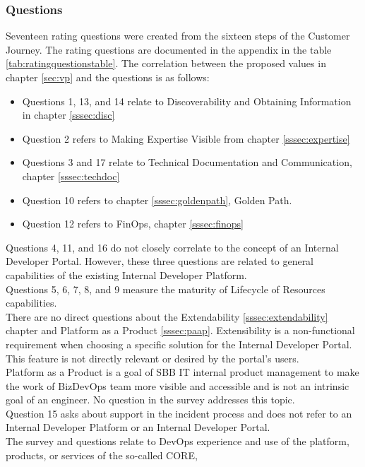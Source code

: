 \documentclass[a4paper,10pt]{article}
\begin{document}
    \subsubsection{Questions}
    \label{sssec:questions}
    Seventeen rating questions were created from the sixteen steps of the Customer Journey.
    The rating questions are documented in the appendix in the table \ref{tab:ratingquestionstable}.
    The correlation between the proposed values in chapter \ref{sec:vp} and the questions is as follows:
    \begin{itemize}
        \item Questions 1, 13, and 14 relate to Discoverability and Obtaining Information in chapter \ref{sssec:disc}
        \item Question 2 refers to Making Expertise Visible from chapter \ref{sssec:expertise}
        \item Questions 3 and 17 relate to Technical Documentation and Communication, chapter \ref{sssec:techdoc}
        \item Question 10 refers to chapter \ref{sssec:goldenpath}, Golden Path.
        \item Question 12 refers to FinOps, chapter \ref{sssec:finops}
    \end{itemize}
    Questions 4, 11, and 16 do not closely correlate to the concept of an Internal Developer Portal.
    However, these three questions are related to general capabilities of the existing Internal Developer Platform.\\
    Questions 5, 6, 7, 8, and 9 measure the maturity of Lifecycle of Resources capabilities.\\
    There are no direct questions about the Extendability \ref{sssec:extendability} chapter and Platform as a Product
    \ref{sssec:paap}.
    Extensibility is a non-functional requirement when choosing a specific solution for the Internal Developer Portal.
    This feature is not directly relevant or desired by the portal's users.\\
    Platform as a Product is a goal of SBB IT internal product management to make the work of BizDevOps
    team more visible and accessible and is not an intrinsic goal of an engineer.
    No question in the survey addresses this topic.\\
    Question 15 asks about support in the incident process and does not refer to an Internal Developer Platform or an
    Internal Developer Portal. \\
    The survey and questions relate to DevOps experience and use of the platform, products, or services of the so-called CORE,
\end{document}
